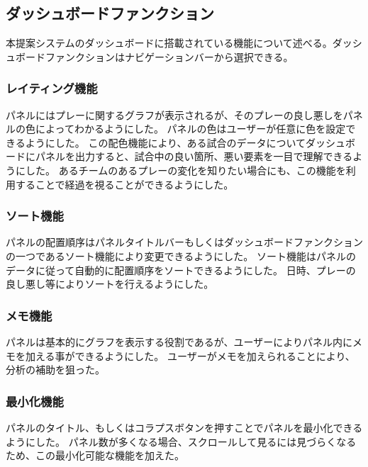 \documentclass[sotsuron]{kuee}
\begin{document}
		\subsection{ダッシュボードファンクション}
			本提案システムのダッシュボードに搭載されている機能について述べる。ダッシュボードファンクションはナビゲーションバーから選択できる。
			\subsubsection{レイティング機能}
			パネルにはプレーに関するグラフが表示されるが、そのプレーの良し悪しをパネルの色によってわかるようにした。
			パネルの色はユーザーが任意に色を設定できるようにした。
			この配色機能により、ある試合のデータについてダッシュボードにパネルを出力すると、試合中の良い箇所、悪い要素を一目で理解できるようにした。
			あるチームのあるプレーの変化を知りたい場合にも、この機能を利用することで経過を視ることができるようにした。
			\subsubsection{ソート機能}
			パネルの配置順序はパネルタイトルバーもしくはダッシュボードファンクションの一つであるソート機能により変更できるようにした。
			ソート機能はパネルのデータに従って自動的に配置順序をソートできるようにした。
			日時、プレーの良し悪し等によりソートを行えるようにした。
			\subsubsection{メモ機能}
			パネルは基本的にグラフを表示する役割であるが、ユーザーによりパネル内にメモを加える事ができるようにした。
			ユーザーがメモを加えられることにより、分析の補助を狙った。
			\subsubsection{最小化機能}
			パネルのタイトル、もしくはコラプスボタンを押すことでパネルを最小化できるようにした。
			パネル数が多くなる場合、スクロールして見るには見づらくなるため、この最小化可能な機能を加えた。
\end{document}
